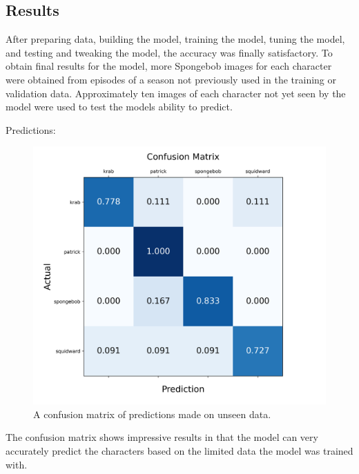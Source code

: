 \documentclass{article}
\begin{document}
\begin{multicols}{2}
\section{Results}

{\quad 
After preparing data, building the model, training the model, tuning the model, and testing and tweaking the model, the accuracy was finally satisfactory. To obtain final results for the model, more Spongebob images for each character were obtained from episodes of a season not previously used in the training or validation data. Approximately ten images of each character not yet seen by the model were used to test the models ability to predict. 

Predictions:

\begin{figure}[H]
  \begin{center}
    \includegraphics[width=\linewidth]{confusion_matrix.png}
  \end{center}
  \caption{A confusion matrix of predictions made on unseen data.}
  \label{fig:confusion}
\end{figure}

The confusion matrix shows impressive results in that the model can very accurately predict the characters based on the limited data the model was trained with. 

}

\end{multicols}
\end{document}

